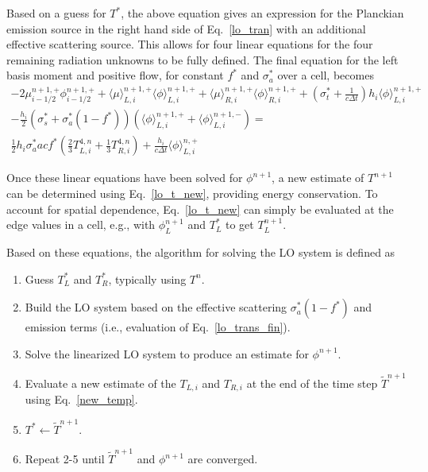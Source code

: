 \documentclass{mc2013}
\newcommand{\mom}[1]{\langle #1 \rangle}
\begin{document}
Based on a guess for $T^*$, the above equation gives an expression for
the Planckian emission source in the right hand side
of Eq.~\eqref{lo_tran} with an additional effective scattering source.
This allows for four linear equations for the four remaining radiation unknowns to be fully
defined.  The final equation for the left basis moment and positive flow, for constant
$f^*$ and $\sigma_a^*$ over a cell, becomes
\begin{multline}\label{lo_trans_fin}
    -2{\mu}_{i-1/2}^{n+1,+} \phi_{i-1/2}^{n+1,+} + \mom {\mu}_{L,i}^{n+1,+}
  \mom{\phi}_{L,i}^{n+1,+}
  +  \mom\mu_{R,i}^{n+1,+}
  \mom{\phi}_{R,i}^{n+1,+} +  \left(\sigma_t^*+\frac{1}{c \Delta t} \right) h_i 
  \mom{\phi}_{L,i}^{n+1,+} \\- \frac{h_i}{2}\left(\sigma_s^* + \sigma_a^*(1-f^*)\right)
  \left( \mom{\phi}_{L,i}^{n+1,+} +
  \mom\phi_{L,i}^{n+1,-}\right) = \\ \frac{1}{2} h_i \sigma_a^*a c f^* \left(\frac{2}{3} T_{L,i}^{4,n} +
  \frac{1}{3} T_{R,i}^{4,n} \right) + 
  \frac{h_i}{c\Delta t}\mom{\phi}_{L,i}^{n,+}
\end{multline}

Once these linear equations have been solved for $\phi^{n+1}$, a new estimate of
$T^{n+1}$ can be determined using Eq.~\eqref{lo_t_new}, providing energy
conservation.  To account for spatial dependence, Eq.~\eqref{lo_t_new} can simply be evaluated
at the edge values in a cell, e.g., with $\phi^{n+1}_L$ and $T^*_L$ to get $T_L^{n+1}$.

Based on these equations, the algorithm for solving the LO system is defined as
\begin{enumerate}
    \item Guess $T^*_L$ and $T^*_R$, typically using $T^n$.
    \item  Build the LO system based on the effective scattering $\sigma_a^*(1-f^*)$ and emission terms
        (i.e., evaluation of  Eq.~\eqref{lo_trans_fin}).
    \item Solve the linearized LO system to produce an estimate for $\phi^{n+1}$.
    \item Evaluate a new estimate of the $T_{L,i}$ and $T_{R,i}$ at the end of the time step
    $\tilde{T}^{n+1}$ using Eq.~\eqref{new_temp}.
    \item $T^*\leftarrow\tilde{T}^{n+1}$.
    \item Repeat 2-5 until $\tilde T^{n+1}$ and $\phi^{n+1}$ are converged.
\end{enumerate}
\end{document}
